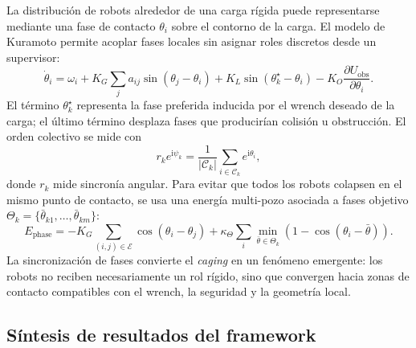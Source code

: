 La distribución de robots alrededor de una carga rígida puede representarse mediante una
fase de contacto $\theta_i$ sobre el contorno de la carga. El modelo de Kuramoto
\citep{kuramoto1984chemical} permite acoplar fases locales sin asignar roles discretos
desde un supervisor:
\begin{equation}
  \dot\theta_i
  =
  \omega_i
  +
  K_G\sum_{j}a_{ij}\sin(\theta_j-\theta_i)
  +
  K_L\sin(\theta_k^\star-\theta_i)
  -
  K_O\frac{\partial U_{\mathrm{obs}}}{\partial\theta_i}.
  \label{eq:kuramoto_AMR}
\end{equation}
El término $\theta_k^\star$ representa la fase preferida inducida por el wrench deseado
de la carga; el último término desplaza fases que producirían colisión u obstrucción. El
orden colectivo se mide con
\begin{equation}
  r_ke^{\mathrm{i}\psi_k}
  =
  \frac{1}{|\mathcal C_k|}
  \sum_{i\in\mathcal C_k}e^{\mathrm{i}\theta_i},
  \label{eq:orden_kuramoto}
\end{equation}
donde $r_k$ mide sincronía angular. Para evitar que todos los robots colapsen en el mismo
punto de contacto, se usa una energía multi-pozo asociada a fases objetivo
$\Theta_k=\{\bar\theta_{k1},\ldots,\bar\theta_{km}\}$:
\begin{equation}
  E_{\mathrm{phase}}
  =
  -K_G\sum_{(i,j)\in\mathcal E}\cos(\theta_i-\theta_j)
  +
  \kappa_\Theta
  \sum_i
  \min_{\bar\theta\in\Theta_k}
  \left(1-\cos(\theta_i-\bar\theta)\right).
  \label{eq:energia_fases_contacto}
\end{equation}
La sincronización de fases convierte el \emph{caging} en un fenómeno emergente: los
robots no reciben necesariamente un rol rígido, sino que convergen hacia zonas de
contacto compatibles con el wrench, la seguridad y la geometría local.

\subsection{Síntesis de resultados del framework}

